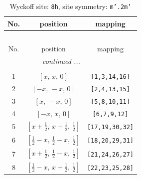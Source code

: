\documentclass[fleqn,8pt]{jsarticle}
\begin{document}
\begin{longtable}{ccc}
\caption{Wyckoff site: {\tt 8h}, site symmetry: {\tt m'.2m'}}
 \\
 \hline \hline
No. & position & mapping \\ \hline \endfirsthead

\multicolumn{2}{l}{\tablename\ \thetable{}} \\
 \hline \hline
No. & position & mapping \\ \hline \endhead

 \hline \hline
\multicolumn{2}{r}{\footnotesize\it continued ...} \\ \endfoot

 \hline \hline
\multicolumn{2}{r}{} \\ \endlastfoot

1 & $\left[ x,\, x,\, 0 \right]$ & {\tt [1,3,14,16]} \\ \hline
2 & $\left[ - x,\, - x,\, 0 \right]$ & {\tt [2,4,13,15]} \\ \hline
3 & $\left[ x,\, - x,\, 0 \right]$ & {\tt [5,8,10,11]} \\ \hline
4 & $\left[ - x,\, x,\, 0 \right]$ & {\tt [6,7,9,12]} \\ \hline
5 & $\left[ x + \frac{1}{2},\, x + \frac{1}{2},\, \frac{1}{2} \right]$ & {\tt [17,19,30,32]} \\ \hline
6 & $\left[ \frac{1}{2} - x,\, \frac{1}{2} - x,\, \frac{1}{2} \right]$ & {\tt [18,20,29,31]} \\ \hline
7 & $\left[ x + \frac{1}{2},\, \frac{1}{2} - x,\, \frac{1}{2} \right]$ & {\tt [21,24,26,27]} \\ \hline
8 & $\left[ \frac{1}{2} - x,\, x + \frac{1}{2},\, \frac{1}{2} \right]$ & {\tt [22,23,25,28]} \\
\end{longtable}
\renewcommand{\arraystretch}{1.2}
\end{document}

